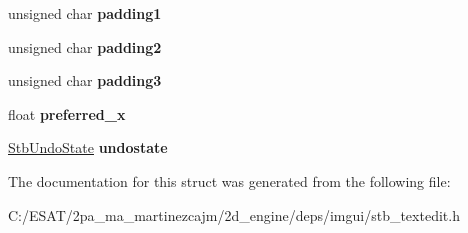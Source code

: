 \begin{DoxyCompactItemize}
\mbox{\label{struct_s_t_b___textedit_state_a1e43e8ac88a8c7f2bba645b333a8bdc7}} 
unsigned char {\bfseries padding1}
\item 
\mbox{\label{struct_s_t_b___textedit_state_af5a708e49f23f79bb14c9b0f4ad03371}} 
unsigned char {\bfseries padding2}
\item 
\mbox{\label{struct_s_t_b___textedit_state_a4c42530e4919171df25b1f00bb95a887}} 
unsigned char {\bfseries padding3}
\item 
\mbox{\label{struct_s_t_b___textedit_state_a527319df94e0fe262548fb48bebf3dea}} 
float {\bfseries preferred\+\_\+x}
\item 
\mbox{\label{struct_s_t_b___textedit_state_a7e1f0366bbd57e01a4f49a720beb9ead}} 
\hyperlink{struct_stb_undo_state}{Stb\+Undo\+State} {\bfseries undostate}
\end{DoxyCompactItemize}


The documentation for this struct was generated from the following file\+:\begin{DoxyCompactItemize}
\item 
C\+:/\+E\+S\+A\+T/2pa\+\_\+ma\+\_\+martinezcajm/2d\+\_\+engine/deps/imgui/stb\+\_\+textedit.\+h\end{DoxyCompactItemize}
